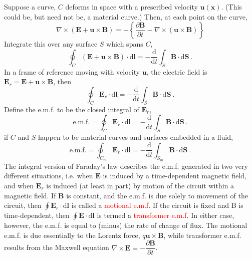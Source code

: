 \documentclass[12pt,a4paper]{article}
\renewcommand{\vec}[1]{\boldsymbol{#1}}
\newcommand{\dif}{\mathrm{d}}
\begin{document}
Suppose a curve, $C$ deforms in space with a prescribed velocity $\vec{u}(\vec{x})$.  (This could be, but need not be, a material curve.) Then, at each point on the curve,
\begin{equation*}
\nabla \times (\vec{E} +\vec{u} \times \vec{B}) = -\left\{\frac{\partial \vec{B}}{\partial t} -\nabla \times (\vec{u} \times \vec{B})  \right\}
\end{equation*}
Integrate this over any surface $S$ which spans $C$,
\begin{equation*}
\oint_C (\vec{E} +\vec{u} \times \vec{B}) \cdot \dif \vec{l} = -\frac{\dif }{\dif t} \int_S \vec{B} \cdot \dif \vec{S}~.
\end{equation*}
In a frame of reference moving with velocity $\vec{u}$, the electric field is $\vec{E}_r = \vec{E} + \vec{u}\times \vec{B}$, then
\begin{equation*}
\oint_C \vec{E}_r \cdot \dif \vec{l} = -\frac{\dif }{\dif t} \int_S \vec{B} \cdot \dif \vec{S} ~.
\end{equation*}
Define the e.m.f. to be the closed integral of $\vec{E}_r$,
\begin{equation}
\text{e.m.f.} = \oint_C \vec{E}_r \cdot \dif \vec{l} = -\frac{\dif }{\dif t} \int_S \vec{B} \cdot \dif \vec{S} ~.
\end{equation}
if $C$ and $S$ happen to be material curves and surfaces embedded in a fluid,
\begin{equation}
\text{e.m.f.} = \oint_{C_m} \vec{E}_r \cdot \dif \vec{l} = -\frac{\dif }{\dif t} \int_{S_m} \vec{B} \cdot \dif \vec{S} ~.
\end{equation}
The integral version of Faraday's law describes the e.m.f. generated in two very different situations, i.e. when $\vec{E}$ is induced by a time-dependent magnetic field, and when $\vec{E}_r $ is induced (at least in part) by motion of the circuit within a magnetic field. If $\vec{B}$ is constant, and the e.m.f. is due solely to movement of the circuit, then $\oint \vec{E}_r \cdot \dif \vec{l}$ is called a \textcolor{red}{motional e.m.f}. If the circuit is fixed and B is time-dependent, then $\oint \vec{E} \cdot \dif \vec{l}$ is termed a \textcolor{red}{transformer e.m.f}. In either case, however, the e.m.f. is equal to (minus) the rate of change of flux. The motional e.m.f. is due essentially to the Lorentz force, $q\vec{u}\times \vec{B}$, while transformer e.m.f. results from the Maxwell equation $\nabla \times \vec{E} = -\dfrac{\partial \vec{B}}{\partial t}$.
\end{document}
